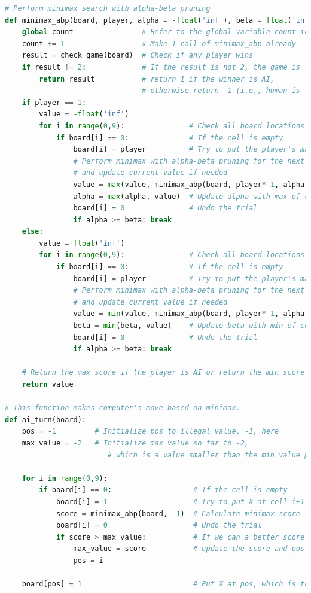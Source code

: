 \documentclass{book}
\begin{document}
\newpage
\begin{lstlisting}[language=Python, basicstyle=\ttfamily\small, keywordstyle=\color{blue}, commentstyle=\color{forestgreen}, stringstyle=\color{red}, showstringspaces=false]
# Perform minimax search with alpha-beta pruning
def minimax_abp(board, player, alpha = -float('inf'), beta = float('inf')):
    global count                # Refer to the global variable count in main
    count += 1                  # Make 1 call of minimax_abp already
    result = check_game(board)  # Check if any player wins
    if result != 2:             # If the result is not 2, the game is finished,
        return result           # return 1 if the winner is AI,
                                # otherwise return -1 (i.e., human is the winner)
    if player == 1:
        value = -float('inf')
        for i in range(0,9):               # Check all board locations
            if board[i] == 0:              # If the cell is empty
                board[i] = player          # Try to put the player's mark at cell i+1
                # Perform minimax with alpha-beta pruning for the next player
                # and update current value if needed
                value = max(value, minimax_abp(board, player*-1, alpha, beta))
                alpha = max(alpha, value)  # Update alpha with max of current alpha and value
                board[i] = 0               # Undo the trial
                if alpha >= beta: break
    else:
        value = float('inf')
        for i in range(0,9):               # Check all board locations
            if board[i] == 0:              # If the cell is empty
                board[i] = player          # Try to put the player's mark at cell i+1
                # Perform minimax with alpha-beta pruning for the next player
                # and update current value if needed
                value = min(value, minimax_abp(board, player*-1, alpha, beta))
                beta = min(beta, value)    # Update beta with min of current beta and value
                board[i] = 0               # Undo the trial
                if alpha >= beta: break

    # Return the max score if the player is AI or return the min score if the player is human
    return value

# This function makes computer's move based on minimax.
def ai_turn(board):
    pos = -1         # Initialize pos to illegal value, -1, here
    max_value = -2   # Initialize max value so far to -2,
                        # which is a value smaller than the min value possible

    for i in range(0,9):
        if board[i] == 0:                   # If the cell is empty
            board[i] = 1                    # Try to put X at cell i+1
            score = minimax_abp(board, -1)  # Calculate minimax score for the human player
            board[i] = 0                    # Undo the trial
            if score > max_value:           # If we can a better score in the next level,
                max_value = score           # update the score and pos
                pos = i

    board[pos] = 1                          # Put X at pos, which is the best move
\end{lstlisting}
\end{document}
